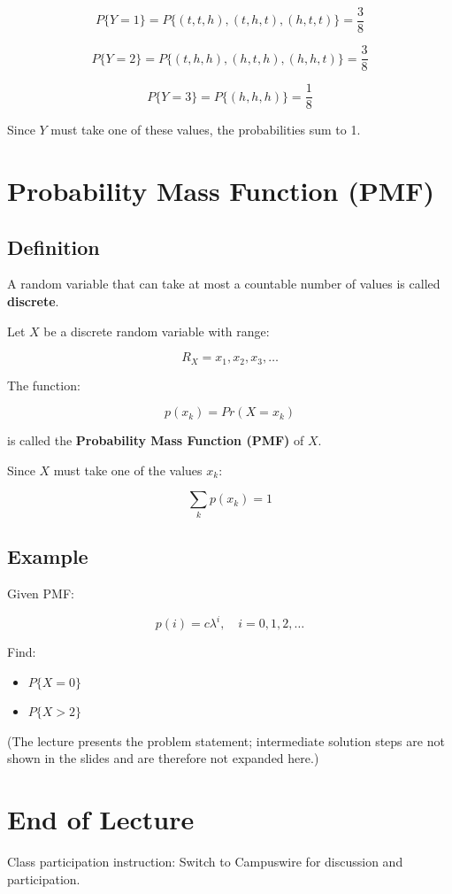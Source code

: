 \documentclass[12pt]{article}
\begin{document}
\[
P\{Y=1\} = P\{(t,t,h),(t,h,t),(h,t,t)\} = \frac{3}{8}
\]

\[
P\{Y=2\} = P\{(t,h,h),(h,t,h),(h,h,t)\} = \frac{3}{8}
\]

\[
P\{Y=3\} = P\{(h,h,h)\} = \frac{1}{8}
\]

Since $Y$ must take one of these values, the probabilities sum to 1.

\section{Probability Mass Function (PMF)}

\subsection{Definition}

A random variable that can take at most a countable number of values is called \textbf{discrete}.

Let $X$ be a discrete random variable with range:

\[
R_X = x_1, x_2, x_3, \ldots
\]

The function:

\[
p(x_k) = Pr(X=x_k)
\]

is called the \textbf{Probability Mass Function (PMF)} of $X$.

Since $X$ must take one of the values $x_k$:

\[
\sum_k p(x_k) = 1
\]

\subsection{Example}

Given PMF:

\[
p(i)=c\lambda^i,\quad i=0,1,2,\ldots
\]

Find:
\begin{itemize}
\item $P\{X=0\}$
\item $P\{X>2\}$
\end{itemize}

(The lecture presents the problem statement; intermediate solution steps are not shown in the slides and are therefore not expanded here.)

\section{End of Lecture}

Class participation instruction:  
Switch to Campuswire for discussion and participation.
\end{document}
